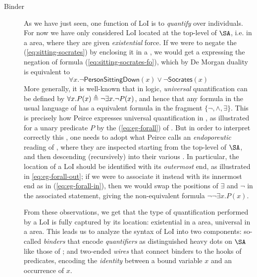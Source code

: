 \begin{scope}
\begin{scope}
\begin{description}
  \item[Binder] As we have just seen, one function of LoI is to \emph{quantify}
  over individuals. For now we have only considered LoI located at the top-level
  of $\SA$, i.e. in a \emph{} area, where they are given
  \emph{existential} force. If we were to negate the 
  (\ref{eq:sitting-socrates}) by enclosing it in a , we would get a 
  expressing the negation of formula (\ref{eq:sitting-socrates-fo}), which by De
  Morgan duality is equivalent to
  $$\forall x. \neg \mathsf{PersonSittingDown}(x) \vee \neg
  \mathsf{Socrates}(x)$$
  More generally, it is well-known that in  logic, \emph{universal}
  quantification can be defined  by $\forall x. P(x) \triangleq \neg
  \exists x. \neg P(x)$, and hence that any formula in the usual language of 
  has a  equivalent formula in the fragment $\{\neg, \land,
  \exists\}$. This is precisely how Peirce expresses universal quantification in
  , as illustrated for a unary predicate $P$ by the 
  (\ref{eq:eg-forall}) of . But in order to interpret
  correctly this , one needs to adopt what Peirce calls an
  \emph{endoporeutic} reading of , where they are inspected starting from the top-level
  of $\SA$, and then descending (recursively) into their various . In
  particular, the location of a LoI should be identified with its
  \emph{outermost} end, as illustrated in  \ref{eq:eg-forall-out}; if we
  were to associate it instead with its innermost end as in 
  (\ref{eq:eg-forall-in}), then we would swap the positions of $\exists$ and
  $\neg$ in the associated statement, giving the non-equivalent formula $\neg
  \neg \exists x. P(x)$.

  From these observations, we get that the type of quantification performed by a
  LoI is fully captured by its location: existential in a  area,
  universal in a  area. This leads us to analyze the syntax of LoI into
  two components: so-called \emph{binders} that encode \emph{quantifiers} as
  distinguished heavy dots on $\SA$ like those of
  ; and two-ended \emph{wires} that connect binders to the hooks of
  predicates, encoding the \emph{identity} between a bound variable $x$ and an
  occurrence of $x$.
  

\end{description}
\end{scope}
\end{scope}
